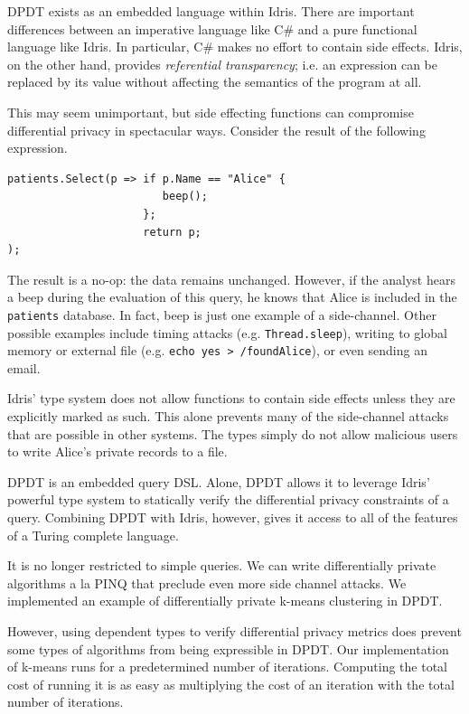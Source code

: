 \documentclass[12pt]{article}
\begin{document}
DPDT exists as an embedded language within Idris.
There are important differences between an imperative language like C\# and a pure functional language like Idris.
In particular, C\# makes no effort to contain side effects.
Idris, on the other hand, provides \textit{referential transparency}; i.e. an expression can be replaced by its value without affecting the semantics of the program at all.

This may seem unimportant, but side effecting functions can compromise differential privacy in spectacular ways.
Consider the result of the following expression.

\begin{lstlisting}
patients.Select(p => if p.Name == "Alice" {
                        beep();
                     };
                     return p;
);
\end{lstlisting}

The result is a no-op: the data remains unchanged.
However, if the analyst hears a beep during the evaluation of this query, he knows that Alice is included in the \texttt{patients} database.
In fact, beep is just one example of a side-channel.
Other possible examples include timing attacks (e.g. \texttt{Thread.sleep}), writing to global memory or external file (e.g. \texttt{echo yes > /foundAlice}), or even sending an email.


Idris' type system does not allow functions to contain side effects unless they are explicitly marked as such.
This alone prevents many of the side-channel attacks that are possible in other systems.
The types simply do not allow malicious users to write Alice's private records to a file.

DPDT is an embedded query DSL.
Alone, DPDT allows it to leverage Idris' powerful type system to statically verify the differential privacy constraints of a query.
Combining DPDT with Idris, however, gives it access to all of the features of a Turing complete language.

It is no longer restricted to simple queries.
We can write differentially private algorithms a la PINQ that preclude even more side channel attacks.
We implemented an example of differentially private k-means clustering in DPDT.

However, using dependent types to verify differential privacy metrics does prevent some types of algorithms from being expressible in DPDT.
Our implementation of k-means runs for a predetermined number of iterations.
Computing the total cost of running it is as easy as multiplying the cost of an iteration with the total number of iterations.
\end{document}

